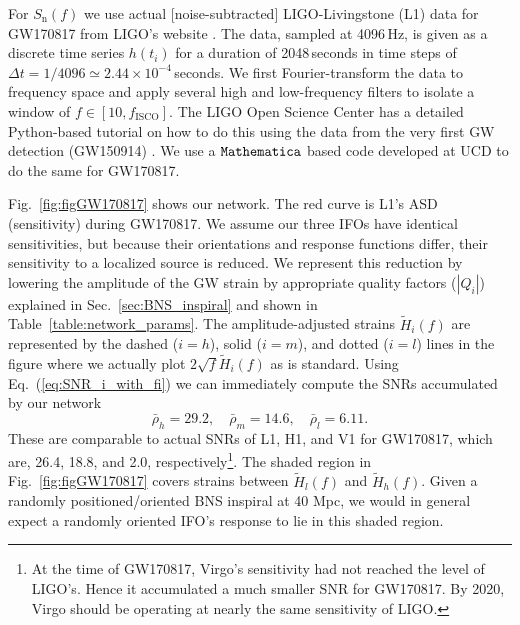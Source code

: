 \documentclass[prd,amsmath,amssymb,aps,floats,amsfonts,notitlepage,superscriptaddress,eqsecnum,nofootinbib,10pt]{revtex4-1}
\newcommand{\be}{\begin{equation}}
\newcommand{\ee}{\end{equation}}
\begin{document}
For $S_\text{n}(f)$ we use actual [noise-subtracted] LIGO-Livingstone (L1) data for GW170817 from LIGO's website \cite{LIGO_L1_data}.
The data, sampled at 4096\,Hz, is given as a discrete time series $h(t_i)$ for a duration of 2048\,seconds in time steps of $\Delta t=1/4096\simeq 2.44\times 10^{-4}\,$seconds.
We first Fourier-transform the data to frequency space and apply several high and low-frequency filters to isolate a window of $f\in [10, f_\text{ISCO}]$.
The LIGO Open Science Center has a detailed Python-based tutorial on how to do this using the data from the very first GW detection (GW150914) \cite{LIGO_tutorial}. 
We use a $\verb|Mathematica|$ based code developed at UCD to do the same for GW170817.

Fig.~\ref{fig:figGW170817} shows our network. The red curve is L1's ASD (sensitivity) during GW170817. We assume our three IFOs have identical sensitivities,
but because their orientations and response functions differ, their sensitivity to a localized source is reduced. We represent this reduction by lowering the
amplitude of the GW strain by appropriate quality factors ($|Q_i|$) explained in Sec.~\ref{sec:BNS_inspiral} and shown in Table~\ref{table:network_params}.
The amplitude-adjusted strains $ \tilde{H}_i(f)$ are represented by the dashed ($i=h$), solid ($i=m$), and dotted ($i=l$) lines in the figure where we actually plot
$2\sqrt{f} \tilde{H}_i(f)$ as is standard. 
Using Eq.~(\ref{eq:SNR_i_with_fi}) we can immediately compute the SNRs accumulated by our network
%
\be
\bar\rho_h = 29.2,\quad \bar\rho_m = 14.6,\quad \bar\rho_l = 6.11 \label{eq:GW170817_SNRs}.
\ee
%
These are comparable to actual SNRs of L1, H1, and V1 for GW170817, which are, 26.4, 18.8, and 2.0, respectively\footnote{At the time of GW170817, Virgo's sensitivity had not reached the level of LIGO's. Hence it accumulated a much smaller SNR for GW170817. By 2020, Virgo should be operating at nearly the same sensitivity of LIGO.}.
The shaded region in Fig.~\ref{fig:figGW170817} covers strains between $\tilde{H}_l(f)$ and $\tilde{H}_h(f)$. %
Given a randomly positioned/oriented BNS inspiral at 40 Mpc, we would in general expect a randomly oriented IFO's response to lie in this shaded region.
\end{document}
